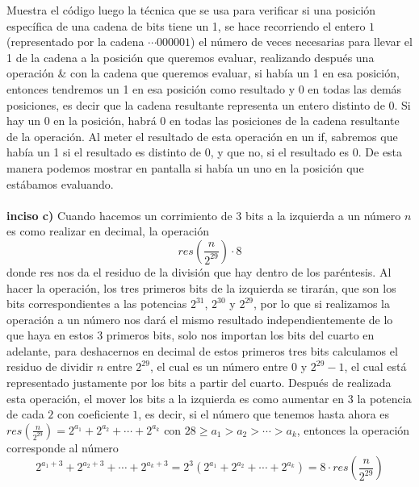 \documentclass[12pt]{article}
\begin{document}
Muestra el código luego la técnica que se usa para verificar si una posición específica de una cadena de bits tiene un 1, se hace recorriendo el entero $1$ (representado por la cadena $\cdots 000001$) el número de veces necesarias para llevar el 1 de la cadena a la posición que queremos evaluar, realizando después una operación \& con la cadena que queremos evaluar, si había un 1 en esa posición, entonces tendremos un 1 en esa posición como resultado y 0 en todas las demás posiciones, es decir que la cadena resultante representa un entero distinto de 0. Si hay un 0 en la posición, habrá 0 en todas las posiciones de la cadena resultante de la operación. Al meter el resultado de esta operación en un if, sabremos que había un 1 si el resultado es distinto de 0, y que no, si el resultado es 0. De esta manera podemos mostrar en pantalla si había un uno en la posición que estábamos evaluando.\\\\

\textbf{inciso c)} Cuando hacemos un corrimiento de 3 bits a la izquierda a un número $n$ es como realizar en decimal, la operación \[ res(\frac{n}{2^{29}})\cdot 8 \]donde res nos da el residuo de la división que hay dentro de los paréntesis. Al hacer la operación, los tres primeros bits de la izquierda se tirarán, que son los bits correspondientes a las potencias $2^{31}$, $2^{30}$ y $2^{29}$, por lo que si realizamos la operación a un número nos dará el mismo resultado independientemente de lo que haya en estos 3 primeros bits, solo nos importan los bits del cuarto en adelante, para deshacernos en decimal de estos primeros tres bits calculamos el residuo de dividir $n$ entre $2^{29}$, el cual es un número entre $0$ y $2^{29}-1$, el cual está representado justamente por los bits a partir del cuarto. Después de realizada esta operación, el mover los bits a la izquierda es como aumentar en 3 la potencia de cada $2$ con coeficiente $1$, es decir, si el número que tenemos hasta ahora es $res(\frac{n}{2^{29}}) =2^{a_1} + 2^{a_2} + \cdots + 2^{a_k}$ con $28 \geq a_1 > a_2 > \cdots > a_k$, entonces la operación corresponde al número \[ 2^{a_1+3} + 2^{a_2+3} + \cdots + 2^{a_k+3} = 2^3 (2^{a_1} + 2^{a_2} + \cdots + 2^{a_k}) = 8 \cdot res(\frac{n}{2^{29}}) \]\\
\end{document}
